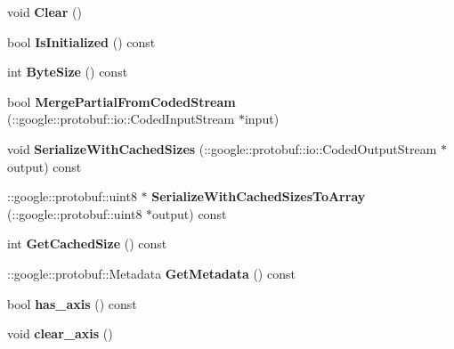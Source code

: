 \begin{DoxyCompactItemize}
void {\bfseries Clear} ()
\item 
\mbox{\label{classcaffe_1_1_scale_parameter_adbef4dfb162b828fcb4f7807090ac639}} 
bool {\bfseries Is\+Initialized} () const
\item 
\mbox{\label{classcaffe_1_1_scale_parameter_a20a525f668dd2ea9d97fc8a18a197139}} 
int {\bfseries Byte\+Size} () const
\item 
\mbox{\label{classcaffe_1_1_scale_parameter_a27c5a7e5c86c2de6a27836ae5db70294}} 
bool {\bfseries Merge\+Partial\+From\+Coded\+Stream} (\+::google\+::protobuf\+::io\+::\+Coded\+Input\+Stream $\ast$input)
\item 
\mbox{\label{classcaffe_1_1_scale_parameter_ad52d47f3aa0f420c9be166da3f815018}} 
void {\bfseries Serialize\+With\+Cached\+Sizes} (\+::google\+::protobuf\+::io\+::\+Coded\+Output\+Stream $\ast$output) const
\item 
\mbox{\label{classcaffe_1_1_scale_parameter_ac0f1d8d35d5b180f7dc65f755bd87c54}} 
\+::google\+::protobuf\+::uint8 $\ast$ {\bfseries Serialize\+With\+Cached\+Sizes\+To\+Array} (\+::google\+::protobuf\+::uint8 $\ast$output) const
\item 
\mbox{\label{classcaffe_1_1_scale_parameter_adf0e2b42b3f4386c1dd2f401b89e4ad3}} 
int {\bfseries Get\+Cached\+Size} () const
\item 
\mbox{\label{classcaffe_1_1_scale_parameter_a5f681712efa004699636c898eb50e051}} 
\+::google\+::protobuf\+::\+Metadata {\bfseries Get\+Metadata} () const
\item 
\mbox{\label{classcaffe_1_1_scale_parameter_a7caca94c1594bb34d0610252471979ed}} 
bool {\bfseries has\+\_\+axis} () const
\item 
\mbox{\label{classcaffe_1_1_scale_parameter_a21136c30a0d8208382ec793c7f54c98d}} 
void {\bfseries clear\+\_\+axis} ()
\item 
\mbox{\label{classcaffe_1_1_scale_parameter_aac59ec392175c0054e9b598f8c19fd40}} 

\end{DoxyCompactItemize}
